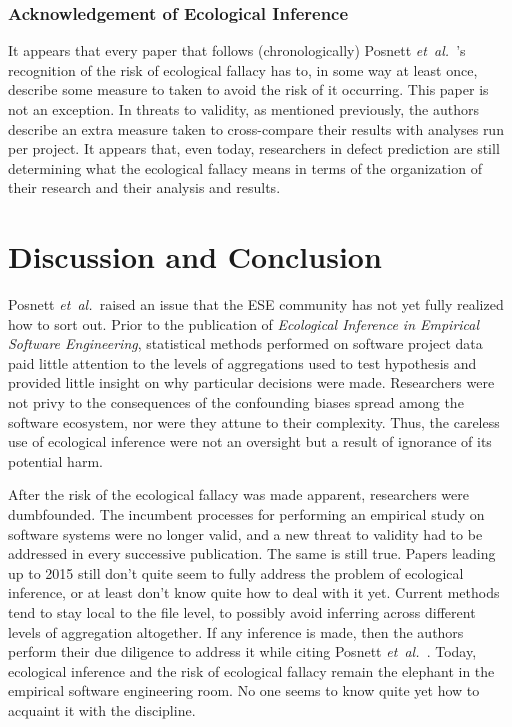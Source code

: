 \documentclass{sig-alternate-05-2015}
\newcommand{\etal}{\mbox{\emph{et al.\ }}}
\begin{document}
\subsubsection{Acknowledgement of Ecological Inference}
It appears that every paper that follows (chronologically) Posnett \etal's recognition of the risk of ecological fallacy has to, in some way at least once, describe some measure to taken to avoid the risk of it occurring. This paper is not an exception. In threats to validity, as mentioned previously, the authors describe an extra measure taken to cross-compare their results with analyses run per project. It appears that, even today, researchers in defect prediction are still determining what the ecological fallacy means in terms of the organization of their research and their analysis and results.

\section{Discussion and Conclusion}
Posnett \etal raised an issue that the ESE community has not yet fully realized how to sort out.  Prior to the publication of \emph{Ecological Inference in Empirical Software Engineering}, statistical methods performed on software project data paid little attention to the levels of aggregations used to test hypothesis and provided little insight on why particular decisions were made.  Researchers were not privy to the consequences of the confounding biases spread among the software ecosystem, nor were they attune to their complexity.  Thus, the careless use of ecological inference were not an oversight but a result of ignorance of its potential harm.

After the risk of the ecological fallacy was made apparent, researchers were dumbfounded.  The incumbent processes for performing an empirical study on software systems were no longer valid, and a new threat to validity had to be addressed in every successive publication.  The same is still true.  Papers leading up to 2015 still don't quite seem to fully address the problem of ecological inference, or at least don't know quite how to deal with it yet.  Current methods tend to stay local to the file level, to possibly avoid inferring across different levels of aggregation altogether.  If any inference is made, then the authors perform their due diligence to address it while citing Posnett \etal.  Today, ecological inference and the risk of ecological fallacy remain the elephant in the empirical software engineering room.  No one seems to know quite yet how to acquaint it with the discipline.






\balancecolumns %
\end{document}
